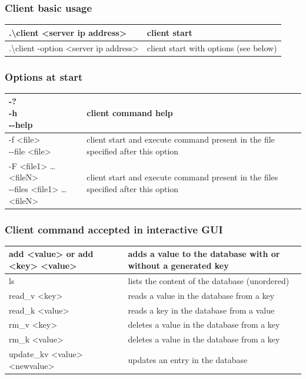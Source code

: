\documentclass[a4paper,11pt]{report}
\begin{document}
    \begin{centering}
        \subsubsection*{Client basic usage}
        \begin{tabular}{|m{6cm}|m{6cm}|}

            \hline
            .\textbackslash client <server ip address> & client start \\
            \hline
            .\textbackslash client -option <server ip address> & client start with options (see below) \\
            \hline
        \end{tabular}
        \subsubsection*{Options at start}
        \begin{tabular}{|m{4.5cm}|m{10.5cm}|}
            \hline
            \shortstack{-? \\ -h \\ -{}-help} & client command help \\
            \hline
            \shortstack{-f <file> \\ -{}-file <file>} & client start and execute command present in the file specified after this option \\
            \hline
            \shortstack{-F <file1> \ldots <fileN> \\ -{}-files <file1> \ldots <fileN>} & client start and execute command present in the files specified after this option \\
            \hline
        \end{tabular}

        \subsubsection*{Client command accepted in interactive GUI}
        \begin{tabular}{|m{7cm}|m{8cm}|}
            \hline
            add <value> or add <key> <value> & adds a value to the database with or without a generated key \\
            \hline
            ls & lists the content of the database (unordered) \\
            \hline
            read\_v <key> & reads a value in the database from a key \\
            \hline
            read\_k <value> & reads a key in the database from a value \\
            \hline
            rm\_v <key> & deletes a value in the database from a key \\
            \hline
            rm\_k <value> & deletes a value in the database from a key \\
            \hline
            update\_kv <value> <newvalue> & updates an entry in the database \\
            \hline
        \end{tabular}
    \end{centering}
\end{document}

